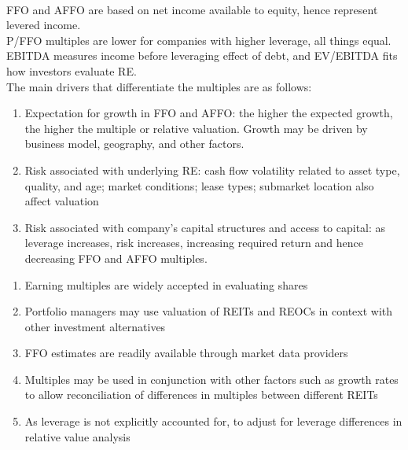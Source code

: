 \begin{remark} \\
FFO and AFFO are based on net income available to equity, hence represent levered income.\\
P/FFO multiples are lower for companies with higher leverage, all things equal.\\
EBITDA measures income before leveraging effect of debt, and EV/EBITDA fits how investors evaluate RE.\\
The main drivers that differentiate the multiples are as follows:
\begin{enumerate}[label=\roman*.]
\setlength{\itemsep}{0pt}
\item Expectation for growth in FFO and AFFO: the higher the expected growth, the higher the multiple or relative valuation. Growth may be driven by business model, geography, and other factors.
\item Risk associated with underlying RE: cash flow volatility related to asset type, quality, and age; market conditions; lease types; submarket location also affect valuation
\item Risk associated with company's capital structures and access to capital: as leverage increases, risk increases, increasing required return and hence decreasing FFO and AFFO multiples.
\end{enumerate}
\end{remark}

\begin{remark} 
\begin{enumerate}[label=\roman*.]
\setlength{\itemsep}{0pt}
\item Earning multiples are widely accepted in evaluating shares
\item Portfolio managers may use valuation of REITs and REOCs in context with other investment alternatives
\item FFO estimates are readily available through market data providers
\item Multiples may be used in conjunction with other factors such as growth rates to allow reconciliation of differences in multiples between different REITs
\item As leverage is not explicitly accounted for, to adjust for leverage differences in relative value analysis
\end{enumerate}
\end{remark}


